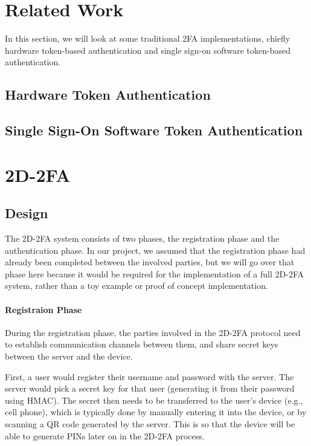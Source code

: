 \documentclass[11pt]{article} %
\begin{document}
\section{Related Work}

In this section, we will look at some traditional 2FA implementations,
chiefly hardware token-based authentication and single sign-on software
token-based authentication.

\subsection{Hardware Token Authentication}



\subsection{Single Sign-On Software Token Authentication}




\section{2D-2FA}



\subsection{Design}

The 2D-2FA system consists of two phases, the registration phase and the
authentication phase. In our project, we assumed that the registration
phase had already been completed between the involved parties, but we
will go over that phase here because it would be required for the
implementation of a full 2D-2FA system, rather than a toy example or
proof of concept implementation.

\paragraph{Registraion Phase}
During the registration phase, the parties involved in the 2D-2FA
protocol need to establish communication channels between them, and
share secret keys between the server and the device. 

First, a user would register their username and password with the
server. The server would pick a secret key for that user (generating it
from their password using HMAC). The secret then needs to be transferred
to the user's device (e.g., cell phone), which is typically done by
manually entering it into the device, or by scanning a QR code generated
by the server. This is so that the device will be able to generate PINs
later on in the 2D-2FA process. 
\end{document}
